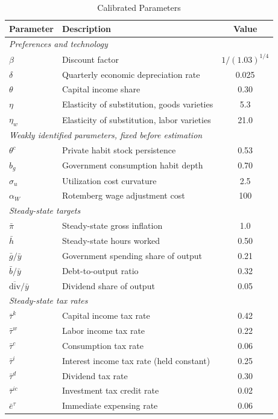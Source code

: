 \begin{table}[ht]
\centering
\caption{Calibrated Parameters}
\label{tab:calib}
\begin{tabular}{llc}
\hline\hline
Parameter & Description & Value \\
\hline
\multicolumn{3}{l}{\textit{Preferences and technology}} \\
$\beta$ & Discount factor & $1/(1.03)^{1/4}$ \\
$\delta$ & Quarterly economic depreciation rate & 0.025 \\
$\theta$ & Capital income share & 0.30 \\
$\eta$ & Elasticity of substitution, goods varieties & 5.3 \\
$\eta_w$ & Elasticity of substitution, labor varieties & 21.0 \\
\hline
\multicolumn{3}{l}{\textit{Weakly identified parameters, fixed before estimation}} \\
$\theta^c$ & Private habit stock persistence & 0.53 \\
$b_g$ & Government consumption habit depth & 0.70 \\
$\sigma_u$ & Utilization cost curvature & 2.5 \\
$\alpha_W$ & Rotemberg wage adjustment cost & 100 \\
\hline
\multicolumn{3}{l}{\textit{Steady-state targets}} \\
$\bar{\pi}$ & Steady-state gross inflation & 1.0 \\
$\bar{h}$ & Steady-state hours worked & 0.50 \\
$\bar{g}/\bar{y}$ & Government spending share of output & 0.21 \\
$\bar{b}/\bar{y}$ & Debt-to-output ratio & 0.32 \\
$\overline{\text{div}}/\bar{y}$ & Dividend share of output & 0.05 \\
\hline
\multicolumn{3}{l}{\textit{Steady-state tax rates}} \\
$\bar{\tau}^k$ & Capital income tax rate & 0.42 \\
$\bar{\tau}^w$ & Labor income tax rate & 0.22 \\
$\bar{\tau}^c$ & Consumption tax rate & 0.06 \\
$\bar{\tau}^i$ & Interest income tax rate (held constant) & 0.25 \\
$\bar{\tau}^d$ & Dividend tax rate & 0.30 \\
$\bar{\tau}^{ic}$ & Investment tax credit rate & 0.02 \\
$\bar{e}^{\tau}$ & Immediate expensing rate & 0.06 \\

\end{tabular}
\end{table}
